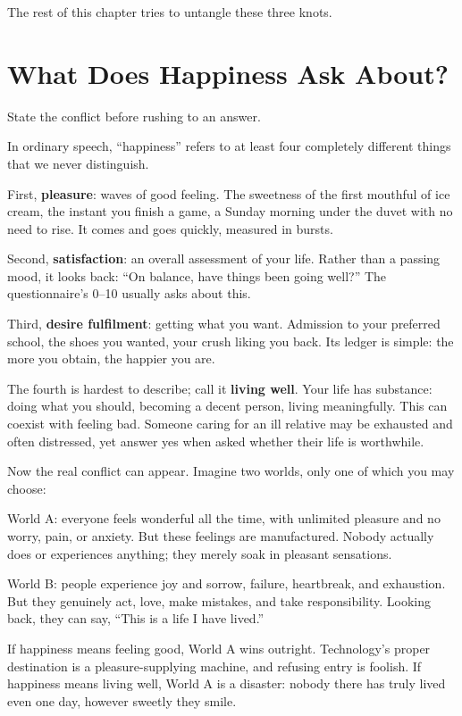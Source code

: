 The rest of this chapter tries to untangle these three knots.

\section{What Does Happiness Ask About?}
State the conflict before rushing to an answer.

In ordinary speech, ``happiness'' refers to at least four completely different things that we never distinguish.

First, \textbf{pleasure}: waves of good feeling. The sweetness of the first mouthful of ice cream, the instant you finish a game, a Sunday morning under the duvet with no need to rise. It comes and goes quickly, measured in bursts.

Second, \textbf{satisfaction}: an overall assessment of your life. Rather than a passing mood, it looks back: ``On balance, have things been going well?'' The questionnaire's 0--10 usually asks about this.

Third, \textbf{desire fulfilment}: getting what you want. Admission to your preferred school, the shoes you wanted, your crush liking you back. Its ledger is simple: the more you obtain, the happier you are.

The fourth is hardest to describe; call it \textbf{living well}. Your life has substance: doing what you should, becoming a decent person, living meaningfully. This can coexist with feeling bad. Someone caring for an ill relative may be exhausted and often distressed, yet answer yes when asked whether their life is worthwhile.

Now the real conflict can appear. Imagine two worlds, only one of which you may choose:

World A: everyone feels wonderful all the time, with unlimited pleasure and no worry, pain, or anxiety. But these feelings are manufactured. Nobody actually does or experiences anything; they merely soak in pleasant sensations.

World B: people experience joy and sorrow, failure, heartbreak, and exhaustion. But they genuinely act, love, make mistakes, and take responsibility. Looking back, they can say, ``This is a life I have lived.''

If happiness means feeling good, World A wins outright. Technology's proper destination is a pleasure-supplying machine, and refusing entry is foolish. If happiness means living well, World A is a disaster: nobody there has truly lived even one day, however sweetly they smile.

